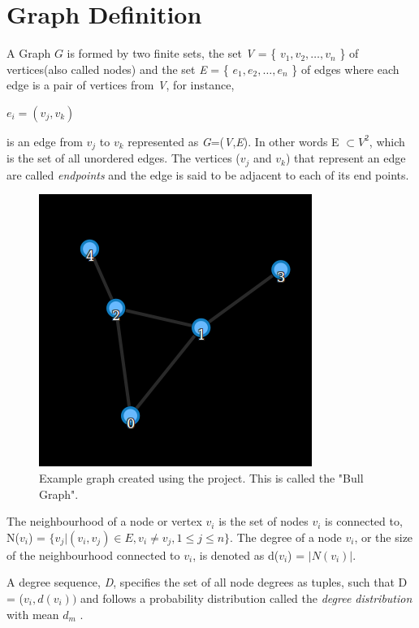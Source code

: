 \section{Graph Definition}
A Graph $G$ is formed by two finite sets, the set \textit{V} = \{ $v_1,v_2, \ldots ,v_n$ \} of vertices(also called nodes) and the set \textit{E} = \{ $e_1,e_2, \ldots,e_n$  \} of edges where each edge is a pair of vertices from \textit{V}, for instance,
\begin{center}
$e_i = (v_j,v_k)$
\end{center}
is an edge from $v_j$ to $v_k$ represented as \textit{G}=(\textit{V},\textit{E}). In other words  E $\subset V^2$, which is the set of all unordered edges. The vertices ($v_j$ and $v_k$) that represent an edge are called \textit{endpoints} and the edge is said to be adjacent to each of its end points.
\begin{figure}[h]
\centering
\includegraphics[scale=0.5]{bull.png}
\caption{Example graph created using the project. This is called the "Bull Graph".}
\end{figure}

The neighbourhood of a node or vertex $v_i$ is the set of
nodes $v_i$ is connected to, N($v_i$) = $\{v_j | (v_i, v_j) \in E, v_i \neq
v_j, 1 \leq j \leq n\}$. The degree of a node $v_i$, or the size of
the neighbourhood connected to $v_i$, is denoted as d($v_i$) =
$|N(v_i)|$. 
\par A degree sequence, \textit{D}, specifies the set of all node
degrees as tuples, such that D = {($v_i, d(v_i))$} and follows a
probability distribution called the \textit{degree distribution} with
mean $d_m$ \cite{githubtest1}.

